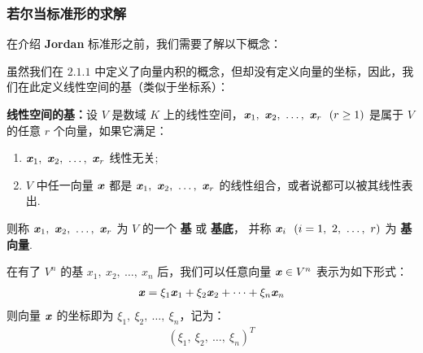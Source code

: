         \subsubsection{若尔当标准形的求解}
            \par 在介绍 \textbf{Jordan} 标准形之前，我们需要了解以下概念：
            \par 虽然我们在 $2.1.1$ 中定义了向量内积的概念，但却没有定义向量的坐标，因此，我们在此定义线性空间的基（类似于坐标系）：
            \par \textbf{线性空间的基：}设 $V$ 是数域 $K$ 上的线性空间，$\textbf{\textit{x}}_1, \ \textbf{\textit{x}}_2, \ \dots, \ \textbf{\textit{x}}_r \ \ (r \geq 1)$ 是属于 $V$ 的任意 $r$ 个向量，如果它满足：
            \begin{enumerate}
                \item $\textbf{\textit{x}}_1, \ \textbf{\textit{x}}_2, \ \dots, \ \textbf{\textit{x}}_r$ 线性无关;
                \item $V$ 中任一向量 $\textbf{\textit{x}}$ 都是 $\textbf{\textit{x}}_1, \ \textbf{\textit{x}}_2, \ \dots, \ \textbf{\textit{x}}_r$ 的线性组合，或者说都可以被其线性表出.
            \end{enumerate}
            则称 $\textbf{\textit{x}}_1, \ \textbf{\textit{x}}_2, \ \dots, \ \textbf{\textit{x}}_r$ 为 $V$ 的一个 \textbf{基} 或 \textbf{基底}， 并称 $\textbf{\textit{x}}_i \ \ (i = 1, \ 2, \ \dots, \ r)$ 为 \textbf{基向量}.
            \\
            \par 在有了 $V^n$ 的基 $x_1, \ x_2, \ \dots, \ x_n$ 后，我们可以任意向量 $\textbf{\textit{x}} \in V^n$ 表示为如下形式：
            \begin{align*}
                \textbf{\textit{x}} = \xi_1\textbf{\textit{x}}_1 + \xi_2\textbf{\textit{x}}_2 + \dots + \xi_n\textbf{\textit{x}}_n
            \end{align*}
            则向量 $\textbf{\textit{x}}$ 的坐标即为 $\xi_1, \ \xi_2, \ \dots, \ \xi_n$，记为：
            \begin{align*}
                (\xi_1, \ \xi_2, \ \dots, \ \xi_n)^T
            \end{align*}

